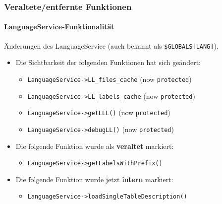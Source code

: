 \begin{frame}[fragile]
	\frametitle{Veraltete/entfernte Funktionen}
	\framesubtitle{LanguageService-Funktionalität}

	Änderungen des LanguageService (auch bekannt als \texttt{\$GLOBALS[LANG]}).
	\vspace{0.4cm}
	\begin{itemize}
		\item Die Sichtbarkeit der folgenden Funktionen hat sich geändert:
			\begin{itemize}\smaller
				\item \texttt{LanguageService->LL\_files\_cache} (now \texttt{protected})
				\item \texttt{LanguageService->LL\_labels\_cache} (now \texttt{protected})
				\item \texttt{LanguageService->getLLL()} (now \texttt{protected})
				\item \texttt{LanguageService->debugLL()} (now \texttt{protected})
			\end{itemize}\normalsize
			\vspace{0.2cm}

		\item Die folgende Funktion wurde als \textbf{veraltet} markiert:
			\begin{itemize}\smaller
				\item \texttt{LanguageService->getLabelsWithPrefix()}
			\end{itemize}\normalsize
			\vspace{0.2cm}

		\item Die folgende Funktion wurde jetzt \textbf{intern} markiert:
			\begin{itemize}\smaller
				\item \texttt{LanguageService->loadSingleTableDescription()}
			\end{itemize}\normalsize
			\vspace{0.2cm}

	\end{itemize}

\end{frame}


